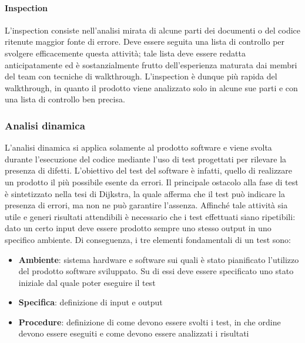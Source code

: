 \paragraph{Inspection}
L’inspection consiste nell'analisi mirata di alcune parti dei
documenti o del codice ritenute maggior fonte di errore. Deve essere
seguita una lista di controllo per svolgere efficacemente questa
attività; tale lista deve essere redatta anticipatamente ed è
sostanzialmente frutto dell'esperienza maturata dai membri del team
con tecniche di walkthrough. L’inspection è dunque più rapida del
walkthrough, in quanto il prodotto viene analizzato solo in alcune
sue parti e con una lista di controllo ben precisa.

\subsubsection{Analisi dinamica}

L'analisi dinamica si applica solamente al prodotto software e viene
svolta durante l'esecuzione del codice mediante l'uso di test
progettati per rilevare la presenza di difetti.
L'obiettivo del test del software è infatti, quello di
realizzare un prodotto il più possibile esente da errori. Il
principale ostacolo alla fase di test è sintetizzato nella tesi di
Dijkstra, la quale afferma che il test può indicare la presenza di
errori, ma non ne può garantire l'assenza.
Affinché tale attività sia utile e generi risultati attendibili è
necessario che i test effettuati siano ripetibili: dato un certo input
deve essere prodotto sempre uno stesso output in uno specifico
ambiente. Di conseguenza, i tre elementi fondamentali di un test sono:

\begin{itemize}
\item \textbf{Ambiente}: sistema hardware e software sui quali è stato
  pianificato l'utilizzo del prodotto software sviluppato. Su di essi
  deve essere specificato uno stato iniziale dal quale poter eseguire
  il test

\item \textbf{Specifica}: definizione di input e output
\item \textbf{Procedure}: definizione di come devono essere svolti i
  test, in che ordine devono essere eseguiti e come devono essere
  analizzati i risultati
\end{itemize}




